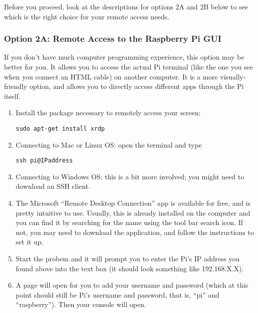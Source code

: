 \documentclass{article}\usepackage[]{graphicx}\usepackage[]{color}
\begin{document}
Before you proceed, look at the descriptions for options 2A and 2B below to see which is the right choice for your remote access needs.

\subsubsection{Option 2A: Remote Access to the Raspberry Pi GUI}

If you don't have much computer programming experience, this option may be better for you.  It allows you to access the actual Pi terminal (like the one you see when you connect an HTML cable) on another computer.  It is a more visually-friendly option, and allows you to directly access different apps through the Pi itself.

\begin{enumerate}

\item Install the package necessary to remotely access your screen: 

\begin{lstlisting}
sudo apt-get install xrdp
\end{lstlisting}

\item Connecting to Mac or Linux OS: open the terminal and type

\begin{lstlisting}
ssh pi@IPaddress
\end{lstlisting}

\item Connecting to Windows OS: this is a bit more involved; you might need to download an SSH client. 

\item The Microsoft ``Remote Desktop Connection'' app is available for free, and is pretty intuitive to use. Usually, this is already installed on the computer and you can find it by searching for the name using the tool bar search icon. If not, you may need to download the application, and follow the instructions to set it up. 

\item Start the probem and it will prompt you to enter the Pi's IP  address you found above into the text box (it should look something like 192.168.X.X).

\item A page will open for you to add your username and password (which at this point should still be Pi's username and password, that is, ``pi'' and ``raspberry'').  Then your console will open.


\end{enumerate}
\end{document}

